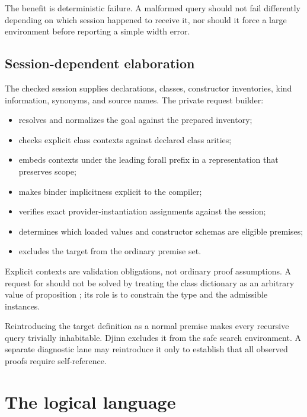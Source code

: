 \documentclass[10pt,letterpaper,oneside]{report}
\newcommand{\code}[1]{\texttt{\detokenize{#1}}}
\begin{document}
The benefit is deterministic failure. A malformed query should not fail differently depending on which session happened to receive it, nor should it force a large environment before reporting a simple width error.

\subsection{Session-dependent elaboration}

The checked session supplies declarations, classes, constructor inventories, kind information, synonyms, and source names. The private request builder:

\begin{itemize}
  \item resolves and normalizes the goal against the prepared inventory;
  \item checks explicit class contexts against declared class arities;
  \item embeds contexts under the leading forall prefix in a representation that preserves scope;
  \item makes binder implicitness explicit to the compiler;
  \item verifies exact provider-instantiation assignments against the session;
  \item determines which loaded values and constructor schemas are eligible premises;
  \item excludes the target from the ordinary premise set.
\end{itemize}

Explicit contexts are validation obligations, not ordinary proof assumptions. A request for \code{C a => a -> a} should not be solved by treating the class dictionary as an arbitrary value of proposition \code{C a}; its role is to constrain the type and the admissible instances.

\begin{pitfallbox}
Reintroducing the target definition as a normal premise makes every recursive query trivially inhabitable. Djinn excludes it from the safe search environment. A separate diagnostic lane may reintroduce it only to establish that all observed proofs require self-reference.
\end{pitfallbox}

\section{The logical language}
\end{document}
